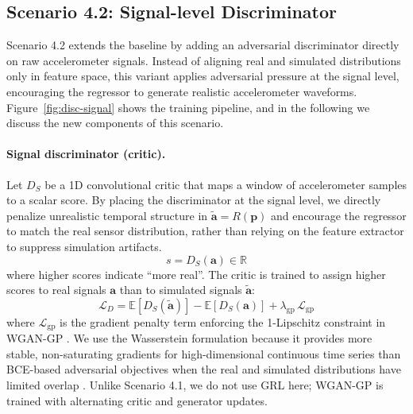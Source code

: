 \subsection{Scenario 4.2: Signal-level Discriminator}
\label{sec:scenario-disc-signal}

Scenario 4.2 extends the baseline by adding an adversarial discriminator directly on raw accelerometer signals. Instead of aligning real and simulated distributions only in feature space, this variant applies adversarial pressure at the signal level, encouraging the regressor to generate realistic accelerometer waveforms. Figure~\ref{fig:disc-signal} shows the training pipeline, and in the following we discuss the new components of this scenario.

\paragraph{Signal discriminator (critic).}
Let $D_S$ be a 1D convolutional critic that maps a window of accelerometer samples to a scalar score. By placing the discriminator at the signal level, we directly penalize unrealistic temporal structure in $\tilde{\mathbf{a}}=R(\mathbf{p})$ and encourage the regressor to match the real sensor distribution, rather than relying on the feature extractor to suppress simulation artifacts.
\begin{equation}
    s = D_S(\mathbf{a}) \in \mathbb{R}
\end{equation}
where higher scores indicate ``more real''. The critic is trained to assign higher scores to real signals $\mathbf{a}$ than to simulated signals $\tilde{\mathbf{a}}$:
\begin{equation}
    \mathcal{L}_D =
    \mathbb{E}[D_S(\tilde{\mathbf{a}})]
    - \mathbb{E}[D_S(\mathbf{a})]
    + \lambda_{\text{gp}} \, \mathcal{L}_{\text{gp}}
\end{equation}
where $\mathcal{L}_{\text{gp}}$ is the gradient penalty term enforcing the 1-Lipschitz constraint in WGAN-GP \cite{gulrajani2017improved}. We use the Wasserstein formulation because it provides more stable, non-saturating gradients for high-dimensional continuous time series than BCE-based adversarial objectives when the real and simulated distributions have limited overlap \cite{arjovsky2017wasserstein,gulrajani2017improved}. Unlike Scenario 4.1, we do not use GRL here; WGAN-GP is trained with alternating critic and generator updates.

